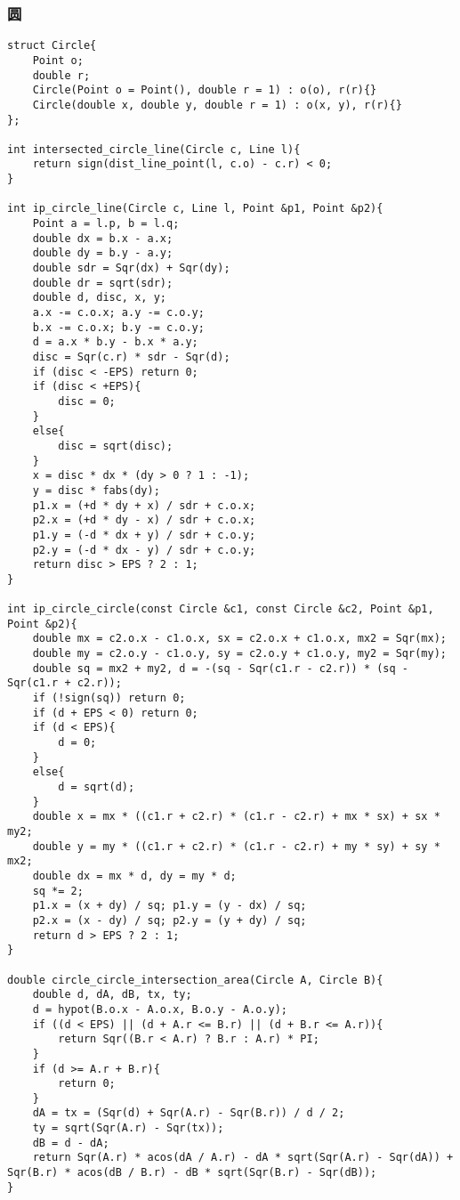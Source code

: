 \subsubsection{圆}
\begin{verbatim}
struct Circle{
    Point o;
    double r;
    Circle(Point o = Point(), double r = 1) : o(o), r(r){}
    Circle(double x, double y, double r = 1) : o(x, y), r(r){}
};

int intersected_circle_line(Circle c, Line l){
    return sign(dist_line_point(l, c.o) - c.r) < 0;
}

int ip_circle_line(Circle c, Line l, Point &p1, Point &p2){
    Point a = l.p, b = l.q;
    double dx = b.x - a.x;
    double dy = b.y - a.y;
    double sdr = Sqr(dx) + Sqr(dy);
    double dr = sqrt(sdr);
    double d, disc, x, y;
    a.x -= c.o.x; a.y -= c.o.y;
    b.x -= c.o.x; b.y -= c.o.y;
    d = a.x * b.y - b.x * a.y;
    disc = Sqr(c.r) * sdr - Sqr(d);
    if (disc < -EPS) return 0;
    if (disc < +EPS){
        disc = 0;
    }
    else{
        disc = sqrt(disc);
    }
    x = disc * dx * (dy > 0 ? 1 : -1);
    y = disc * fabs(dy);
    p1.x = (+d * dy + x) / sdr + c.o.x;
    p2.x = (+d * dy - x) / sdr + c.o.x;
    p1.y = (-d * dx + y) / sdr + c.o.y;
    p2.y = (-d * dx - y) / sdr + c.o.y;
    return disc > EPS ? 2 : 1;
}

int ip_circle_circle(const Circle &c1, const Circle &c2, Point &p1, Point &p2){
    double mx = c2.o.x - c1.o.x, sx = c2.o.x + c1.o.x, mx2 = Sqr(mx);
    double my = c2.o.y - c1.o.y, sy = c2.o.y + c1.o.y, my2 = Sqr(my);
    double sq = mx2 + my2, d = -(sq - Sqr(c1.r - c2.r)) * (sq - Sqr(c1.r + c2.r));
    if (!sign(sq)) return 0;
    if (d + EPS < 0) return 0;
    if (d < EPS){
        d = 0;
    }
    else{
        d = sqrt(d);
    }
    double x = mx * ((c1.r + c2.r) * (c1.r - c2.r) + mx * sx) + sx * my2;
    double y = my * ((c1.r + c2.r) * (c1.r - c2.r) + my * sy) + sy * mx2;
    double dx = mx * d, dy = my * d;
    sq *= 2;
    p1.x = (x + dy) / sq; p1.y = (y - dx) / sq;
    p2.x = (x - dy) / sq; p2.y = (y + dy) / sq;
    return d > EPS ? 2 : 1; 
}

double circle_circle_intersection_area(Circle A, Circle B){
    double d, dA, dB, tx, ty;
    d = hypot(B.o.x - A.o.x, B.o.y - A.o.y);
    if ((d < EPS) || (d + A.r <= B.r) || (d + B.r <= A.r)){
        return Sqr((B.r < A.r) ? B.r : A.r) * PI;
    }
    if (d >= A.r + B.r){
        return 0;
    }
    dA = tx = (Sqr(d) + Sqr(A.r) - Sqr(B.r)) / d / 2;
    ty = sqrt(Sqr(A.r) - Sqr(tx));
    dB = d - dA;
    return Sqr(A.r) * acos(dA / A.r) - dA * sqrt(Sqr(A.r) - Sqr(dA)) + Sqr(B.r) * acos(dB / B.r) - dB * sqrt(Sqr(B.r) - Sqr(dB));
}


\end{verbatim}

